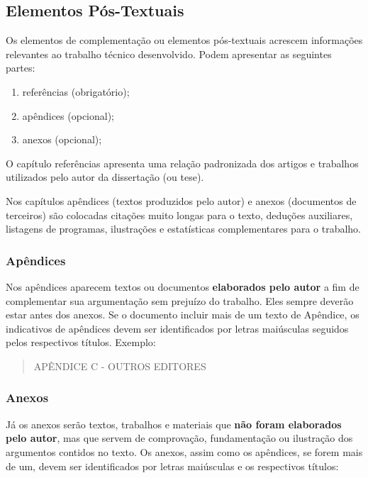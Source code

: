 \documentclass[repeatfields,xlists,xpacks,oneside,yearsonly]{ufrgscca}
\begin{document}
\subsection{Elementos Pós-Textuais}

Os elementos de complementação ou elementos pós-textuais acrescem
informações relevantes ao trabalho técnico desenvolvido. Podem apresentar as
seguintes partes:

\begin{enumerate}
    \item referências (obrigatório);
    \item apêndices (opcional);
    \item anexos (opcional);
\end{enumerate}

O capítulo referências apresenta uma relação padronizada dos artigos e
trabalhos utilizados pelo autor da dissertação (ou tese).

Nos capítulos apêndices (textos produzidos pelo autor) e anexos (documentos
de terceiros) são colocadas citações muito longas para o texto, deduções
auxiliares, listagens de programas, ilustrações e estatísticas
complementares para o trabalho.

\subsubsection{Apêndices}

Nos apêndices aparecem textos ou documentos {\bf elaborados pelo autor}  a
fim de complementar sua argumentação sem prejuízo do trabalho. Eles sempre
deverão estar antes dos anexos. Se o documento incluir mais de um texto de
Apêndice, os indicativos de apêndices devem ser identificados por letras
maiúsculas seguidos pelos respectivos títulos. Exemplo:\\

\begin{quote}APÊNDICE C  - OUTROS EDITORES\\\end{quote}

\subsubsection{Anexos}

Já os anexos serão textos, trabalhos e materiais que {\bf não foram
    elaborados pelo autor}, mas que servem de comprovação, fundamentação ou
ilustração dos argumentos contidos no texto. Os anexos, assim como os
apêndices, se forem mais de um, devem ser identificados por letras
maiúsculas e os respectivos títulos:\\
\end{document}
